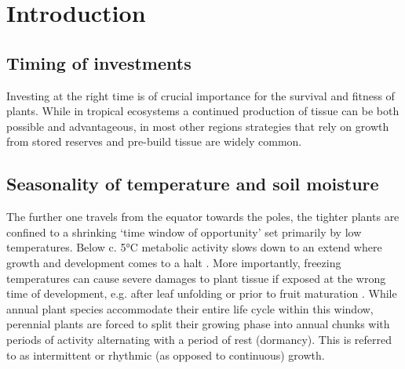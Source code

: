 \documentclass{article}
\begin{document}
\section*{Introduction}
	
	\subsection*{Timing of investments}
		Investing at the right time is of crucial importance for the survival and fitness of plants. While in tropical ecosystems a continued production of tissue can be both possible and advantageous, in most other regions strategies that rely on growth from stored reserves and pre-build tissue are widely common. %

	\subsection*{Seasonality of temperature and soil moisture}
		The further one travels from the equator towards the poles, the tighter plants are confined to a shrinking ‘time window of opportunity’ set primarily by low temperatures. Below c. 5°C  metabolic activity slows down to an extend where growth and development comes to a halt \citep{schenkerPhysiologicalMinimumTemperatures2014, rossiCriticalTemperaturesXylogenesis2008, kornerWinterCropGrowth2008}. More importantly, freezing temperatures can cause severe damages to plant tissue if exposed at the wrong time of development, e.g. after leaf unfolding or prior to fruit maturation \citep{baumgartenNoRiskNo2023a}. While annual plant species accommodate their entire life cycle within this window, perennial plants are forced to split their growing phase into annual chunks with periods of activity alternating with a period of rest (dormancy). This is referred to as intermittent or rhythmic (as opposed to continuous) growth. \\
		
\end{document}
